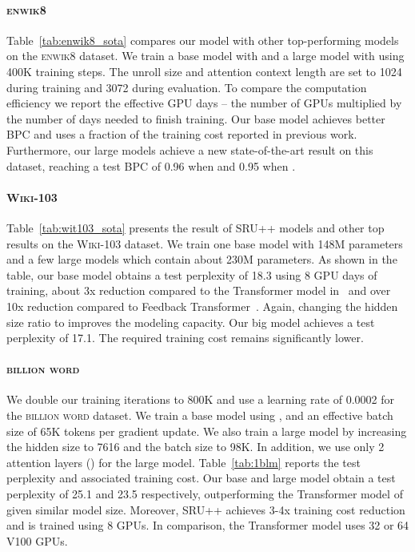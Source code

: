 \paragraph{\textsc{enwik8}}
Table~\ref{tab:enwik8_sota} compares our model with other top-performing models on the \textsc{enwik8} dataset.
We train a base model with  and a large model with  using 400K training steps.
The unroll size and attention context length are set to 1024 during training and 3072 during evaluation.
To compare the computation efficiency we report the effective GPU days -- the number of GPUs multiplied by the number of days needed to finish training. 
Our base model achieves better BPC and uses a fraction of the training cost reported in previous work.
Furthermore, our large models achieve a new state-of-the-art result on this dataset, reaching a test BPC of 0.96 when  and 0.95 when . 


\paragraph{\textsc{Wiki-103}}
Table~\ref{tab:wit103_sota} presents the result of SRU++ models and other top results on the \textsc{Wiki-103} dataset. 
We train one base model with 148M parameters and a few large models which contain about 230M parameters.
As shown in the table, our base model obtains a test perplexity of 18.3 using 8 GPU days of training, about 3x reduction compared to the Transformer model in~\citet{baevski2018adaptive} and over 10x reduction compared to Feedback Transformer~\cite{fan2020accessing}.
Again, changing the hidden size ratio to  improves the modeling capacity.
Our big model achieves a test perplexity of 17.1.
The required training cost remains significantly lower.

\paragraph{\textsc{billion word}}
We double our training iterations to 800K and use a learning rate of 0.0002 for the \textsc{billion word} dataset. 
We train a base model using ,  and an effective batch size of 65K tokens per gradient update.
We also train a large model by increasing the hidden size  to 7616 and the batch size to 98K.
In addition, we use only 2 attention layers () for the large model.
Table~\ref{tab:1blm} reports the test perplexity and associated training cost.
Our base and large model obtain a test perplexity of 25.1 and 23.5 respectively, outperforming the Transformer model of~\citet{baevski2018adaptive} given similar model size.
Moreover, SRU++ achieves 3-4x training cost reduction and is trained using 8 GPUs.
In comparison, the Transformer model uses 32 or 64 V100 GPUs.

